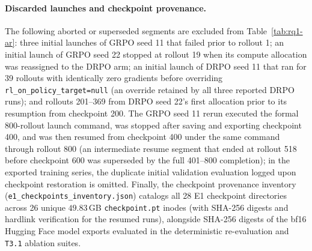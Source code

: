 \documentclass[10pt]{article}
\newcommand{\codepath}[1]{\texttt{#1}}
\begin{document}
\paragraph{Discarded launches and checkpoint provenance.}
The following aborted or superseded segments are excluded from Table~\ref{tab:rq1-ar}: three initial launches of GRPO seed 11 that failed prior to rollout 1; an initial launch of GRPO seed 22 stopped at rollout 19 when its compute allocation was reassigned to the DRPO arm; an initial launch of DRPO seed 11 that ran for 39 rollouts with identically zero gradients before overriding \texttt{rl\_on\_policy\_target=null} (an override retained by all three reported DRPO runs); and rollouts 201--369 from DRPO seed 22's first allocation prior to its resumption from checkpoint 200.
The GRPO seed 11 rerun executed the formal 800-rollout launch command, was stopped after saving and exporting checkpoint 400, and was then resumed from checkpoint 400 under the same command through rollout 800 (an intermediate resume segment that ended at rollout 518 before checkpoint 600 was superseded by the full 401--800 completion); in the exported training series, the duplicate initial validation evaluation logged upon checkpoint restoration is omitted.
Finally, the checkpoint provenance inventory (\codepath{e1\_checkpoints\_inventory.json}) catalogs all 28 E1 checkpoint directories across 26 unique $49.83$\,GB \texttt{checkpoint.pt} inodes (with SHA-256 digests and hardlink verification for the resumed runs), alongside SHA-256 digests of the bf16 Hugging Face model exports evaluated in the deterministic re-evaluation and \texttt{T3.1} ablation suites.
\end{document}
